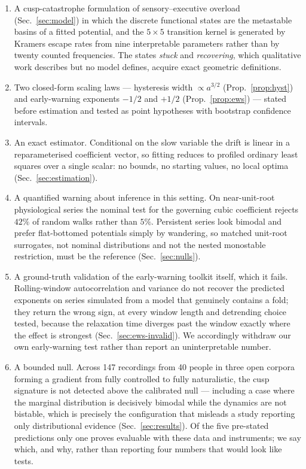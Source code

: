 \documentclass[conference]{IEEEtran}
\begin{document}
\begin{enumerate}
\item A cusp-catastrophe formulation of sensory--executive overload
  (Sec.~\ref{sec:model}) in which the discrete functional states are the
  metastable basins of a fitted potential, and the $5\times5$ transition kernel
  is generated by Kramers escape rates from nine interpretable parameters
  rather than by twenty counted frequencies. The states \emph{stuck} and
  \emph{recovering}, which qualitative work describes but no model defines,
  acquire exact geometric definitions.
\item Two closed-form scaling laws --- hysteresis width $\propto a^{3/2}$
  (Prop.~\ref{prop:hyst}) and early-warning exponents $-1/2$ and $+1/2$
  (Prop.~\ref{prop:ews}) --- stated before estimation and tested as point
  hypotheses with bootstrap confidence intervals.
\item An exact estimator. Conditional on the slow variable the drift is linear
  in a reparameterised coefficient vector, so fitting reduces to profiled
  ordinary least squares over a single scalar: no bounds, no starting values,
  no local optima (Sec.~\ref{sec:estimation}).
\item A quantified warning about inference in this setting. On near-unit-root
  physiological series the nominal test for the governing cubic coefficient
  rejects $42\%$ of random walks rather than $5\%$. Persistent
  series look bimodal and prefer flat-bottomed potentials simply by wandering,
  so matched unit-root surrogates, not nominal distributions and not the nested
  monostable restriction, must be the reference (Sec.~\ref{sec:nulls}).
\item A ground-truth validation of the early-warning toolkit itself, which it
  fails. Rolling-window autocorrelation and variance do not recover the
  predicted exponents on series simulated from a model that genuinely contains
  a fold; they return the wrong sign, at every window length and detrending
  choice tested, because the relaxation time diverges past the window exactly
  where the effect is strongest (Sec.~\ref{sec:ews-invalid}). We accordingly
  withdraw our own early-warning test rather than report an uninterpretable
  number.
\item A bounded null. Across 147 recordings from 40 people in three open
  corpora forming a gradient from fully controlled to fully naturalistic, the
  cusp signature is not detected above the calibrated null --- including a case
  where the marginal distribution is decisively bimodal while the dynamics are
  not bistable, which is precisely the configuration that misleads a study
  reporting only distributional evidence (Sec.~\ref{sec:results}). Of the five
  pre-stated predictions only one proves evaluable with these data and
  instruments; we say which, and why, rather than reporting four numbers that
  would look like tests.
\end{enumerate}
\end{document}
